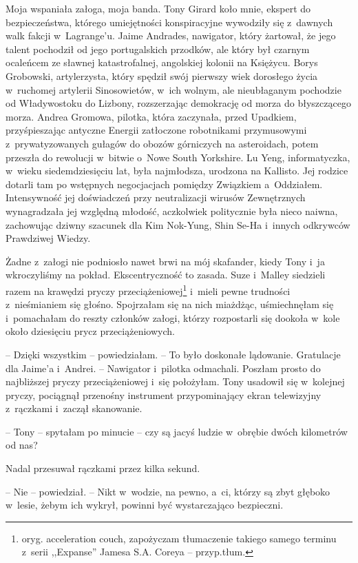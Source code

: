 \documentclass[oneside,polish,11pt,sfheadings]{mwbk}
\begin{document}
Moja wspaniała załoga, moja banda. Tony Girard koło mnie, ekspert do
bezpieczeństwa, którego umiejętności konspiracyjne wywodziły się z~dawnych walk fakcji w~Lagrange'u. Jaime Andrades, nawigator, który
żartował, że jego talent pochodził od jego portugalskich przodków, ale
który był czarnym ocaleńcem ze sławnej katastrofalnej, angolskiej
kolonii na Księżycu. Borys Grobowski, artylerzysta, który spędził swój
pierwszy wiek dorosłego życia w~ruchomej artylerii Sinosowietów, w~ich
wolnym, ale nieubłaganym pochodzie od Władywostoku do Lizbony,
rozszerzając demokrację od morza do błyszczącego morza. Andrea Gromowa,
pilotka, która zaczynała, przed Upadkiem, przyśpieszając antyczne
Energii zatłoczone robotnikami przymusowymi z~prywatyzowanych gułagów do
obozów górniczych na asteroidach, potem przeszła do rewolucji w~bitwie o~Nowe South Yorkshire. Lu Yeng, informatyczka, w~wieku siedemdziesięciu
lat, była najmłodsza, urodzona na Kallisto. Jej rodzice dotarli tam po
wstępnych negocjacjach pomiędzy Związkiem a~Oddziałem. Intensywność jej
doświadczeń przy neutralizacji wirusów Zewnętrznych wynagradzała jej
względną młodość, aczkolwiek politycznie była nieco naiwna, zachowując
dziwny szacunek dla Kim Nok-Yung, Shin Se-Ha i~innych odkrywców
Prawdziwej Wiedzy.

Żadne z~załogi nie podniosło nawet brwi na mój skafander, kiedy Tony i~ja wkroczyliśmy na pokład. Ekscentryczność to zasada. Suze i~Malley
siedzieli razem na krawędzi pryczy przeciążeniowej\footnote{ oryg.
acceleration couch, zapożyczam tłumaczenie takiego samego terminu z~serii ,,Expanse''
Jamesa S.A. Coreya -- przyp.tłum.} i~mieli pewne trudności z~nieśmianiem
się głośno. Spojrzałam się na nich miażdżąc, uśmiechnęłam się i~pomachałam do reszty członków załogi, którzy rozpostarli się dookoła w~kole około dziesięciu prycz przeciążeniowych.

-- Dzięki wszystkim -- powiedziałam. -- To było doskonałe lądowanie.
Gratulacje dla Jaime'a i~Andrei. -- Nawigator i~pilotka odmachali.
Poszłam prosto do najbliższej pryczy przeciążeniowej i~się położyłam.
Tony usadowił się w~kolejnej pryczy, pociągnął przenośny instrument
przypominający ekran telewizyjny z~rączkami i~zaczął skanowanie.

-- Tony -- spytałam po minucie -- czy są jacyś ludzie w~obrębie dwóch
kilometrów od nas?

Nadal przesuwał rączkami przez kilka sekund.

-- Nie -- powiedział. -- Nikt w~wodzie, na pewno, a~ci, którzy są zbyt
głęboko w~lesie, żebym ich wykrył, powinni być wystarczająco bezpieczni.
\end{document}
